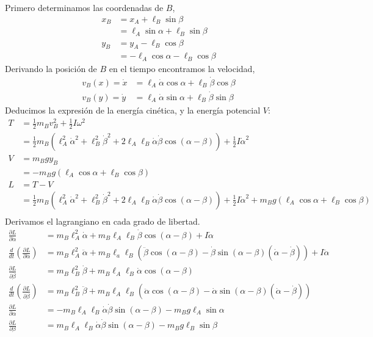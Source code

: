 \documentclass[10pt]{article}
\begin{document}
Primero determinamos las coordenadas de $B$,
\begin{align*}
x_B &= x_A + \ell_B\sin{\beta} \\
	&= \ell_A\sin{\alpha} + \ell_B\sin{\beta} \\
y_B &= y_A - \ell_B\cos{\beta} \\
	&= -\ell_A\cos{\alpha} - \ell_B\cos{\beta}
\end{align*}
Derivando la posición de $B$ en el tiempo encontramos la velocidad,
\begin{align*}
v_B(x) = \dot{x} &= \ell_A\dot{\alpha}\cos{\alpha} + \ell_B\dot{\beta}\cos{\beta} \\
v_B(y) = \dot{y} &= \ell_A\dot{\alpha}\sin{\alpha} + \ell_B\dot{\beta}\sin{\beta}
\end{align*}
Deducimos la expresión de la energía cinética,
y la energía potencial $V$:
\begin{align*}
T &= \frac12m_Bv_B^2 + \frac12I\omega^2 \\
	&= \frac12m_B\left(\ell_A^2\dot{\alpha}^2+\ell_B^2\dot{\beta}^2+ 2\ell_A\ell_B\dot{\alpha}\dot{\beta}\cos{(\alpha-\beta)}\right) + \frac12I\dot{\alpha}^2 \\
V &= m_Bgy_B \\
	&= -m_Bg\left(\ell_A\cos{\alpha} + \ell_B\cos{\beta}\right) \\
L &= T-V \\
 &= \frac12m_B\left(\ell_A^2\dot{\alpha}^2+\ell_B^2\dot{\beta}^2+ 2\ell_A\ell_B\dot{\alpha}\dot{\beta}\cos{(\alpha-\beta)}\right) + \frac12I\dot{\alpha}^2 + m_Bg\left(\ell_A\cos{\alpha} + \ell_B\cos{\beta}\right) \\
\end{align*}
Derivamos el lagrangiano en cada grado de libertad.
\begin{align*}
\frac{\partial L}{\partial \dot{\alpha}} &= m_B\ell_A^2\dot{\alpha}+m_B\ell_A\ell_B\dot{\beta}\cos{(\alpha-\beta)}+I\dot{\alpha} \\
\frac{d}{dt}\left(\frac{\partial L}{\partial \dot{\alpha}}\right) &= m_B\ell_A^2\ddot{\alpha} + m_B\ell_a\ell_B(\ddot{\beta}\cos{(\alpha-\beta)}-\dot{\beta}\sin{(\alpha-\beta)}(\dot{\alpha}-\dot{\beta}) ) + I\ddot{\alpha}\\
\frac{\partial L}{\partial \dot{\beta}} &= m_B\ell_B^2\dot{\beta}+m_B\ell_A\ell_B\dot{\alpha}\cos{(\alpha-\beta)} \\
\frac{d}{dt}\left(\frac{\partial L}{\partial \dot{\beta}}\right) &= m_B\ell_B^2\ddot{\beta} + m_B\ell_A\ell_B(\ddot{\alpha}\cos{(\alpha-\beta)}-\dot{\alpha}\sin{(\alpha-\beta)}(\dot{\alpha}-\dot{\beta})) \\
\frac{\partial L}{\partial \alpha} &= -m_B\ell_A\ell_B\dot{\alpha}\dot{\beta}\sin{(\alpha - \beta)} - m_Bg\ell_A\sin{\alpha} \\
\frac{\partial L}{\partial \beta} &= m_B\ell_A\ell_B\dot{\alpha}\dot{\beta}\sin{(\alpha-\beta)}-m_Bg\ell_B\sin{\beta}
\end{align*}
\end{document}
